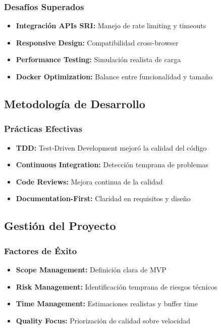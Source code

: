 \documentclass[12pt,a4paper]{article}
\begin{document}
\subsubsection{Desafíos Superados}

\begin{itemize}
    \item \textbf{Integración APIs SRI:} Manejo de rate limiting y timeouts
    \item \textbf{Responsive Design:} Compatibilidad cross-browser
    \item \textbf{Performance Testing:} Simulación realista de carga
    \item \textbf{Docker Optimization:} Balance entre funcionalidad y tamaño
\end{itemize}

\subsection{Metodología de Desarrollo}

\subsubsection{Prácticas Efectivas}

\begin{itemize}
    \item \textbf{TDD:} Test-Driven Development mejoró la calidad del código
    \item \textbf{Continuous Integration:} Detección temprana de problemas
    \item \textbf{Code Reviews:} Mejora continua de la calidad
    \item \textbf{Documentation-First:} Claridad en requisitos y diseño
\end{itemize}

\subsection{Gestión del Proyecto}

\subsubsection{Factores de Éxito}

\begin{itemize}
    \item \textbf{Scope Management:} Definición clara de MVP
    \item \textbf{Risk Management:} Identificación temprana de riesgos técnicos
    \item \textbf{Time Management:} Estimaciones realistas y buffer time
    \item \textbf{Quality Focus:} Priorización de calidad sobre velocidad
\end{itemize}
\end{document}
